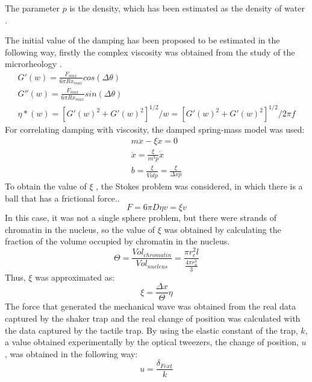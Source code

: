 \documentclass[12pt, a4paper]{article} %
\begin{document}
The parameter $p$ is the density, which has been estimated as the density of water \cite{patterson1994measurement}. 

The initial value of the damping has been proposed to be estimated in the following way, firstly the complex viscosity was obtained from the study of the microrheology \cite{el2008measuring, robertson2018optical}. 
\begin{equation} \label{eqn:microreology}
	\begin{array}{ l }
		
		G'(w) = \frac{F_{max}}{6\pi R x_{max}} cos(\Delta \theta) \\
		G''(w) = \frac{F_{max}}{6\pi R x_{max}} sin(\Delta \theta) \\
		\eta *(w) = [G'(w)^{2}+G'(w)^{2}]^{1/2}/w = [G'(w)^{2}+G'(w)^{2}]^{1/2}/2\pi f
		
	\end{array}
\end{equation}
For correlating damping with viscosity, the damped spring-mass model was used:
\begin{equation} \label{eqn:modelo_masa_resorte}
	\begin{array}{ l }
		
		m\ddot{x} - \xi \dot{x} = 0 \\
		\ddot{x} = \frac{\xi}{m^{3}p}\dot{x} \\
		b = \frac{\xi}{\bar{Vol} p} = \frac{\xi}{\Delta x p}
		
	\end{array}
\end{equation}
To obtain the value of $\xi$ , the Stokes problem was considered, in which there is a ball that has a frictional force..
\begin{equation} \label{eqn:stokes}
	F = 6\pi D \eta v = \xi v
\end{equation}
In this case, it was not a single sphere problem, but there were strands of chromatin in the nucleus, so the value of $\xi$ was obtained by calculating the fraction of the volume occupied by chromatin in the nucleus.
\begin{equation} \label{eqn:frac_nucl_chro}
	\Theta = \frac{Vol_{chromatin}}{Vol_{nucleus}} = \frac{\pi r_{c}^{2} l}{\frac{4\pi r_{n}^{3}}{3}}
\end{equation}
Thus, $\xi$ was approximated as:
\begin{equation} \label{eqn:xi_approx}
	\xi = \frac{\Delta x}{\Theta} \eta
\end{equation}
The force that generated the mechanical wave was obtained from the real data captured by the shaker trap and the real change of position was calculated with the data captured by the tactile trap. By using the elastic constant of the trap, $k$, a value obtained experimentally by the optical tweezers, the change of position, $u$, was obtained in the following way:
\begin{equation} \label{eqn:real_desp}
	u = \frac{\delta_{Fext}}{k}
\end{equation}
\newpage
\setlength{\parskip}{0mm}
\end{document}
